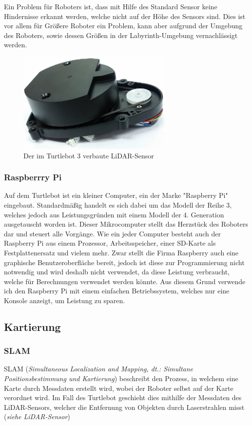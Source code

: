 {{{			Ein Problem für Roboters ist, dass mit Hilfe des Standard Sensor keine Hindernisse erkannt werden, welche nicht auf der Höhe des Sensors sind. Dies ist vor allem für Größere Roboter ein Problem, kann aber aufgrund der Umgebung des Roboters, sowie dessen Größen in der Labyrinth-Umgebung vernachlässigt werden.
			\begin{figure}[H]
				\centering
				\includegraphics[height=5cm]{Bilder/lds_small.png}
				\caption{Der im Turtlebot 3 verbaute LiDAR-Sensor}
				\label{pic:lds_small}
			\end{figure}
		}
		
		\subsubsection{Raspberrry Pi}
		{
			Auf dem Turtlebot ist ein kleiner Computer, ein der Marke "Raspberry Pi" eingebaut. Standardmäßig handelt es sich dabei um das Modell der Reihe 3, welches jedoch aus Leistungsgründen mit einem Modell der 4. Generation ausgetauscht worden ist. Dieser Mikrocomputer stellt das Herzstück des Roboters dar und steuert alle Vorgänge. Wie ein jeder Computer besteht auch der Raspberry Pi aus einem Prozessor, Arbeitsspeicher, einer SD-Karte als Festplattenersatz und vielem mehr. Zwar stellt die Firma Raspberry auch eine graphische Benutzeroberfläche bereit, jedoch ist diese zur Programmierung nicht notwendig und wird deshalb nicht verwendet, da diese Leistung verbraucht, welche für Berechnungen verwendet werden könnte. Aus diesem Grund verwende ich den Raspberry Pi mit einem einfachen Betriebssystem, welches nur eine Konsole anzeigt, um Leistung zu sparen.
		}
	}
	\subsection{Kartierung}
	{
		\subsubsection{SLAM}
		{
			SLAM (\textit{Simultaneous Localization and Mapping, dt.: Simultane Positionsbestimmung und Kartierung}) beschreibt den Prozess, in welchem eine Karte durch Messdaten erstellt wird, wobei der Roboter selbst auf der Karte verordnet wird.
			Im Fall des Turtlebot geschieht dies mithilfe der Messdaten des LiDAR-Sensors, welcher die Entfernung von Objekten durch Laserstrahlen misst (\textit{siehe LiDAR-Sensor})	
		}
		
}}
